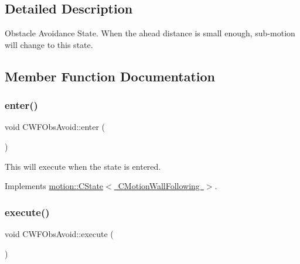 \subsection{Detailed Description}
Obstacle Avoidance State. When the ahead distance is small enough, sub-\/motion will change to this state. 

\subsection{Member Function Documentation}
\mbox{\label{classmotion_1_1CWFObsAvoid_aee2e80e821ecd29528f048c99813b63a}} 
\subsubsection{\texorpdfstring{enter()}{enter()}}
{\footnotesize\ttfamily void C\+W\+F\+Obs\+Avoid\+::enter (\begin{DoxyParamCaption}\item[{\mbox{\hyperlink{classmotion_1_1CMotionWallFollowing}{C\+Motion\+Wall\+Following}} $\ast$}]{ }\end{DoxyParamCaption})\hspace{0.3cm}{\ttfamily [virtual]}}

This will execute when the state is entered. 

Implements \mbox{\hyperlink{classmotion_1_1CState_a53d5fcfec223b58ccdd364a8430fd23c}{motion\+::\+C\+State$<$ C\+Motion\+Wall\+Following $>$}}.

\mbox{\label{classmotion_1_1CWFObsAvoid_a458771fccc326a8b02e4f947cdbb7f3b}} 
\subsubsection{\texorpdfstring{execute()}{execute()}}
{\footnotesize\ttfamily void C\+W\+F\+Obs\+Avoid\+::execute (\begin{DoxyParamCaption}\item[{\mbox{\hyperlink{classmotion_1_1CMotionWallFollowing}{C\+Motion\+Wall\+Following}} $\ast$}]{ }\end{DoxyParamCaption})\hspace{0.3cm}{\ttfamily [virtual]}}

